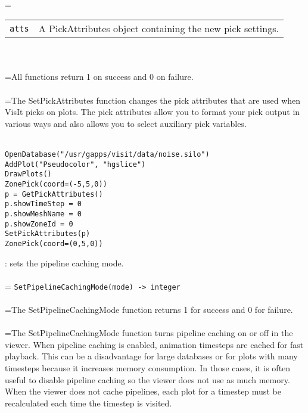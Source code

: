 \documentclass[10pt,a4paper]{report}
\begin{document}
 \\ 
\hangindent=\parindent 
\begin{tabular}{lp{9cm}}
\verb!atts! & A PickAttributes object containing the new pick settings. \\
\end{tabular} \\[-2mm]


 \\ 
\hangindent=\parindent All functions return 1 on success and 0 on failure. \\[-3mm] 

 \\ 
\hangindent=\parindent The SetPickAttributes function changes the pick attributes that are used when VisIt picks on plots. The pick attributes allow you to format your pick output in various ways and also allows you to select auxiliary pick variables. \\[-3mm] 

\\[-6mm]
\begin{verbatim}OpenDatabase("/usr/gapps/visit/data/noise.silo")
AddPlot("Pseudocolor", "hgslice")
DrawPlots()
ZonePick(coord=(-5,5,0))
p = GetPickAttributes()
p.showTimeStep = 0
p.showMeshName = 0
p.showZoneId = 0
SetPickAttributes(p)
ZonePick(coord=(0,5,0))
\end{verbatim}
\newpage


{}
: sets the pipeline caching mode.\\[-3mm]

 \\ 
\hangindent=\parindent 
\verb!SetPipelineCachingMode(mode) -> integer!\\ [-3mm]

 \\ 
\hangindent=\parindent The SetPipelineCachingMode function returns 1 for success and 0 for failure. \\[-3mm] 

 \\ 
\hangindent=\parindent The SetPipelineCachingMode function turns pipeline caching on or off in the viewer. When pipeline caching is enabled, animation timesteps are cached for fast playback. This can be a disadvantage for large databases or for plots with many timesteps because it increases memory consumption. In those cases, it is often useful to disable pipeline caching so the viewer does not use as much memory. When the viewer does not cache pipelines, each plot for a timestep must be recalculated each time the timestep is visited. \\[-3mm] 
\end{document}
